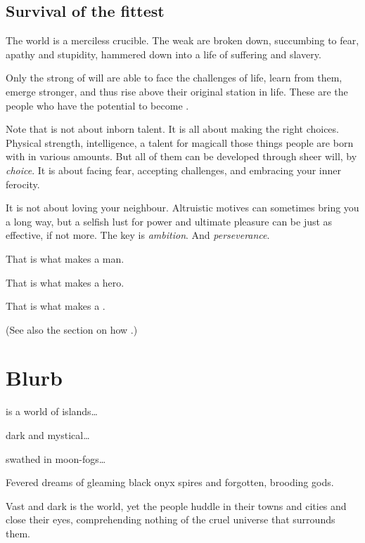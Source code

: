 \subsection{Survival of the fittest}
The world is a merciless crucible. 
The weak are broken down, succumbing to fear, apathy and stupidity, hammered down into a life of suffering and slavery. 

Only the strong of will are able to face the challenges of life, learn from them, emerge stronger, and thus rise above their original station in life. 
These are the people who have the potential to become \vertices. 

Note that  is not about inborn talent. 
It is all about making the right choices. 
Physical strength, intelligence, a talent for magic\dash all those things people are born with in various amounts. 
But all of them can be developed through sheer will, by \emph{choice}. 
It is about facing fear, accepting challenges, and embracing your inner ferocity. 

It is not about loving your neighbour. 
Altruistic motives can sometimes bring you a long way, but a selfish lust for power and ultimate pleasure can be just as effective, if not more. 
The key is \emph{ambition}. And \emph{perseverance}. 

That is what makes a man. 

That is what makes a hero. 

That is what makes a \vertex. 

(See also the section on how .)















\section{Blurb}
\begin{blurb}
\Miith{} is a world of islands\ldots{}

dark and mystical\ldots{}

swathed in moon-fogs\ldots{}

Fevered dreams of gleaming black onyx spires and forgotten, brooding gods. 

Vast and dark is the world, yet the people huddle in their towns and cities and close their eyes, comprehending nothing of the cruel universe that surrounds them. 
\end{blurb}















